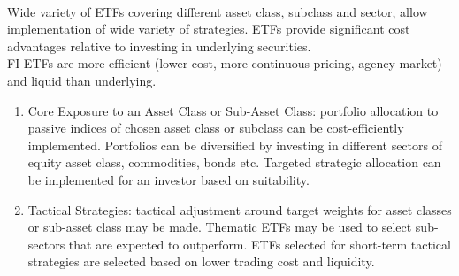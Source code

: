 \begin{remark}  \\
Wide variety of ETFs covering different asset class, subclass and sector, allow implementation of wide variety of strategies. ETFs provide significant cost advantages relative to investing in underlying securities.\\
FI ETFs are more efficient (lower cost, more continuous pricing, agency market) and liquid than underlying.
\begin{enumerate}[label=\roman*.]
\setlength{\itemsep}{0pt}
\item Core Exposure to an Asset Class or Sub-Asset Class: portfolio allocation to passive indices of chosen asset class or subclass can be cost-efficiently implemented. Portfolios can be diversified by investing in different sectors of equity asset class, commodities, bonds etc. Targeted strategic allocation can be implemented for an investor based on suitability.
\item Tactical Strategies: tactical adjustment around target weights for asset classes or sub-asset class may be made. Thematic ETFs may be used to select sub-sectors that are expected to outperform. ETFs selected for short-term tactical strategies are selected based on lower trading cost and liquidity.
\end{enumerate}
\end{remark}

